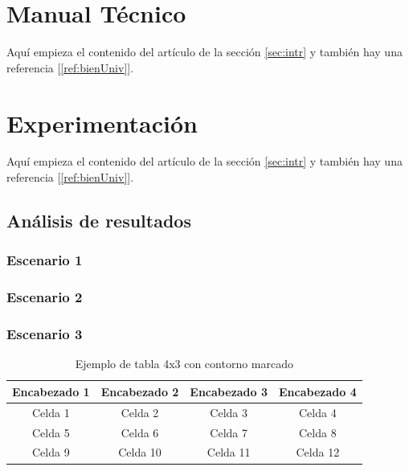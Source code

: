 \documentclass{article}
\begin{document}

\section{Manual Técnico}\label{sec:man_t}
Aquí empieza el contenido del artículo de la sección \ref{sec:intr} y también hay una referencia [\ref{ref:bienUniv}].



\section{Experimentación}\label{sec:man_t}
Aquí empieza el contenido del artículo de la sección \ref{sec:intr} y también hay una referencia [\ref{ref:bienUniv}].

\subsection{Análisis de resultados}

\subsubsection{Escenario 1}

\subsubsection{Escenario 2}

\subsubsection{Escenario 3}


\renewcommand{\tablename}{Tabla}
\begin{table}[htbp]
  \centering
  \caption{Ejemplo de tabla 4x3 con contorno marcado \label{tab:Prueba}}
  \begin{tabular}{|c|c|c|c|} %
    \hline
    Encabezado 1 & Encabezado 2 & Encabezado 3 & Encabezado 4 \\
    \hline
    Celda 1 & Celda 2 & Celda 3 & Celda 4 \\
    \hline
    Celda 5 & Celda 6 & Celda 7 & Celda 8 \\
    \hline
    Celda 9 & Celda 10 & Celda 11 & Celda 12 \\
    \hline
  \end{tabular}
\end{table}
\end{document}
